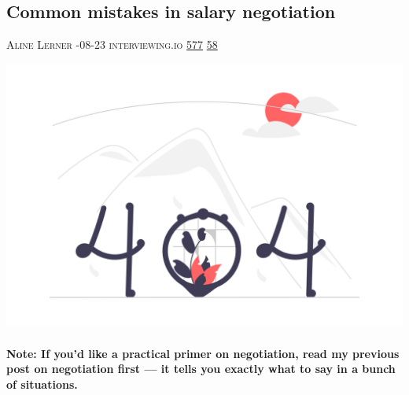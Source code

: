 \documentclass[10pt,a4paper]{article}
\begin{document}
\begin{multicols*}{2}

\noindent\begin{minipage}{\linewidth}
\subsection{Common mistakes in salary negotiation}
\textsc{\footnotesize
{\scriptsize\faUser}\space 
Aline Lerner 
{\scriptsize\faCalendar}-08-23 
{\scriptsize\faGlobe}\space 
interviewing.io 
{\scriptsize\faThumbsOUp}\space 
\href{http://news.ycombinator.com/item?id=37239747\&utm\_term=comment}{577} 
{\scriptsize\faComments}\space 
\href{http://news.ycombinator.com/item?id=37239747\&utm\_term=comment}{58} 
}
\par\medskip\noindent
\href{https://interviewing.io/blog/sabotage-salary-negotiation-before-even-start?utm\_source=hackernewsletter\&utm\_medium=email\&utm\_term=working}{
    \includegraphics[width=0.99\linewidth]{notfound.png}
}
\end{minipage}
\paragraph{}
\textbf{Note: If you’d like a practical primer on negotiation, read my previous post on negotiation first — it tells you exactly what to say in a bunch of situations.}

\end{multicols*}
\end{document}
